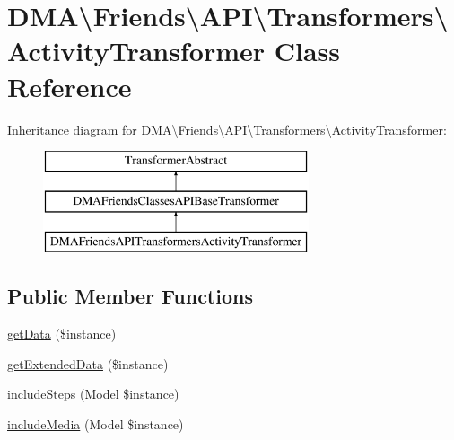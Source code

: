 \hypertarget{classDMA_1_1Friends_1_1API_1_1Transformers_1_1ActivityTransformer}{}\section{D\+M\+A\textbackslash{}Friends\textbackslash{}A\+P\+I\textbackslash{}Transformers\textbackslash{}Activity\+Transformer Class Reference}
\label{classDMA_1_1Friends_1_1API_1_1Transformers_1_1ActivityTransformer}
Inheritance diagram for D\+M\+A\textbackslash{}Friends\textbackslash{}A\+P\+I\textbackslash{}Transformers\textbackslash{}Activity\+Transformer\+:\begin{figure}[H]
\begin{center}
\leavevmode
\includegraphics[height=3.000000cm]{dc/d08/classDMA_1_1Friends_1_1API_1_1Transformers_1_1ActivityTransformer}
\end{center}
\end{figure}
\subsection*{Public Member Functions}
\begin{DoxyCompactItemize}
\item 
\hyperlink{classDMA_1_1Friends_1_1API_1_1Transformers_1_1ActivityTransformer_a0de84700162b94dc38fd224057f8a858}{get\+Data} (\$instance)
\item 
\hyperlink{classDMA_1_1Friends_1_1API_1_1Transformers_1_1ActivityTransformer_abb084721de5785ff9fdc5c4e63d45631}{get\+Extended\+Data} (\$instance)
\item 
\hyperlink{classDMA_1_1Friends_1_1API_1_1Transformers_1_1ActivityTransformer_a1ce3329a76543ad2d84bca30c6f2601d}{include\+Steps} (Model \$instance)
\item 
\hyperlink{classDMA_1_1Friends_1_1API_1_1Transformers_1_1ActivityTransformer_a96359bb45e92bd0b02ebd0a70787dd29}{include\+Media} (Model \$instance)
\end{DoxyCompactItemize}
